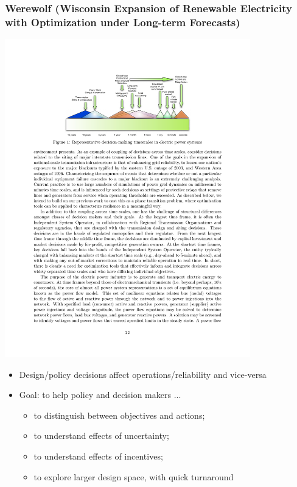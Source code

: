 \documentclass[xcolor=dvipsnames]{beamer}
\begin{document}
\begin{frame}
  \frametitle{Werewolf (Wisconsin Expansion of Renewable Electricity with Optimization under Long-term Forecasts)}

  \centering
  \includegraphics[width=0.8\textwidth]{includes/timescales.pdf}

  \begin{itemize}
  \item Design/policy decisions affect operations/reliability and vice-versa
  \item Goal: to help policy and decision makers ...
    \begin{itemize}
    \item to distinguish between objectives and actions;
    \item to understand effects of uncertainty;
    \item to understand effects of incentives;
    \item to explore larger design space, \alert{with quick turnaround}
    \end{itemize}
  \end{itemize}

\end{frame}
\end{document}
